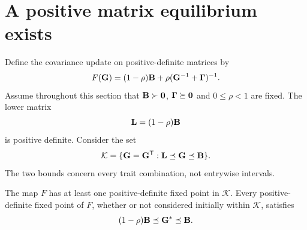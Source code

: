 \section{A positive matrix equilibrium exists}
\label{inheritance:matrix-fixed-point}

Define the covariance update on positive-definite matrices by
\begin{equation}
  F(\mathbf{G})=(1-\rho)\mathbf{B}+
                       \rho(\mathbf{G}^{-1}+\boldsymbol{\Gamma})^{-1}.
  \label{inheritance:map}
\end{equation}
Assume throughout this section that $\mathbf{B}\succ\mathbf{0}$,
$\boldsymbol{\Gamma}\succeq\mathbf{0}$ and $0\leq\rho<1$ are fixed.
The lower matrix
\begin{equation}
  \mathbf{L}=(1-\rho)\mathbf{B}
\end{equation}
is positive definite. Consider the set
\begin{equation}
  \mathcal K=\{\mathbf{G}=\mathbf{G}^{\mathsf T}:\mathbf{L}\preceq\mathbf{G}\preceq\mathbf{B}\}.
  \label{inheritance:interval}
\end{equation}
The two bounds concern every trait combination, not entrywise intervals.

\begin{proposition}
  \label{inheritance:existence}
  The map $F$ has at least one positive-definite fixed point in
  $\mathcal K$. Every positive-definite fixed point of $F$, whether or
  not considered initially within $\mathcal K$, satisfies
  \begin{equation}
    (1-\rho)\mathbf{B}\preceq\mathbf{G}^*\preceq\mathbf{B}.
    \label{inheritance:fixed-bounds}
  \end{equation}
\end{proposition}

